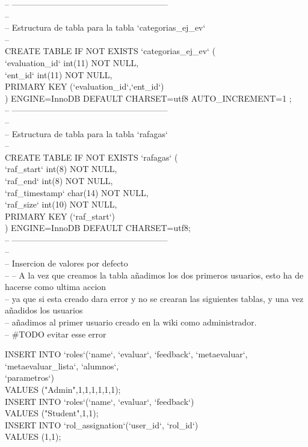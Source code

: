-- --------------------------------------------------------\\

--\\
-- Estructura de tabla para la tabla `categorias\_ej\_ev`\\
--\\

CREATE TABLE IF NOT EXISTS `categorias\_ej\_ev` (\\
`evaluation\_id` int(11) NOT NULL,\\
`ent\_id` int(11) NOT NULL,\\
PRIMARY KEY (`evaluation\_id`,`ent\_id`)\\
) ENGINE=InnoDB DEFAULT CHARSET=utf8 AUTO\_INCREMENT=1 ;\\

-- --------------------------------------------------------\\

--\\
-- Estructura de tabla para la tabla `rafagas`\\
--\\

CREATE TABLE IF NOT EXISTS `rafagas` (\\
`raf\_start` int(8) NOT NULL,\\
`raf\_end` int(8) NOT NULL,\\
`raf\_timestamp` char(14) NOT NULL,\\
`raf\_size` int(10) NOT NULL,\\
PRIMARY KEY (`raf\_start`)\\
) ENGINE=InnoDB DEFAULT CHARSET=utf8;\\

-- --------------------------------------------------------\\


--\\
-- Insercion de valores por defecto\\
--
-- A la vez que creamos la tabla añadimos los dos primeros usuarios, esto ha de hacerse como ultima accion\\
-- ya que si esta creado dara error y no se crearan las siguientes tablas, y una vez añadidos los usuarios\\
-- añadimos al primer usuario creado en la wiki como administrador.\\
-- \#TODO evitar esse error

INSERT INTO `roles`(`name`, `evaluar`, `feedback`, `metaevaluar`, `metaevaluar\_lista`, `alumnos`,\\ `parametros`)\\
VALUES ("Admin",1,1,1,1,1,1);\\
INSERT INTO `roles`(`name`, `evaluar`, `feedback`)  \\
VALUES ("Student",1,1);\\
INSERT INTO `rol\_assignation`(`user\_id`, `rol\_id`)\\
VALUES (1,1);\\

